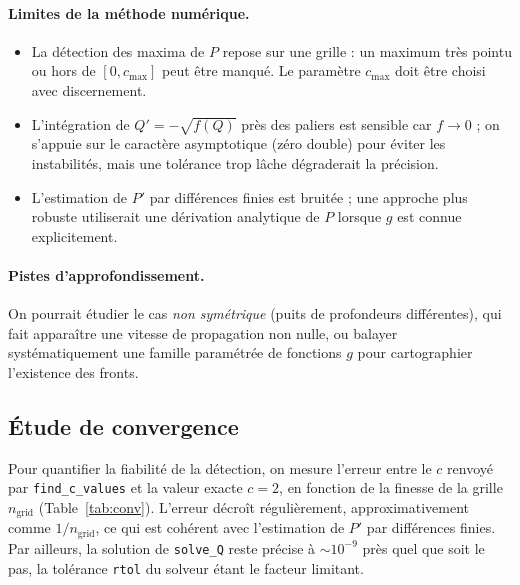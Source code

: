 \documentclass[11pt,a4paper]{article}
\theoremstyle{plain}
\theoremstyle{remark}
\begin{document}
\paragraph{Limites de la méthode numérique.}
\begin{itemize}[leftmargin=1.6em]
  \item La détection des maxima de $P$ repose sur une grille : un maximum très
  pointu ou hors de $[0,c_{\max}]$ peut être manqué. Le paramètre $c_{\max}$ doit
  être choisi avec discernement.
  \item L'intégration de $Q'=-\sqrt{f(Q)}$ près des paliers est sensible car
  $f\to0$ ; on s'appuie sur le caractère asymptotique (zéro double) pour éviter
  les instabilités, mais une tolérance trop lâche dégraderait la précision.
  \item L'estimation de $P'$ par différences finies est bruitée ; une approche
  plus robuste utiliserait une dérivation analytique de $P$ lorsque $g$ est connue
  explicitement.
\end{itemize}

\paragraph{Pistes d'approfondissement.} On pourrait étudier le cas
\emph{non symétrique} (puits de profondeurs différentes), qui fait apparaître une
vitesse de propagation non nulle, ou balayer systématiquement une famille
paramétrée de fonctions $g$ pour cartographier l'existence des fronts.

\subsection{Étude de convergence}
Pour quantifier la fiabilité de la détection, on mesure l'erreur entre le
$c$ renvoyé par \texttt{find\_c\_values} et la valeur exacte $c=2$, en fonction
de la finesse de la grille $n_{\text{grid}}$ (Table~\ref{tab:conv}). L'erreur
décroît régulièrement, approximativement comme $1/n_{\text{grid}}$, ce qui est
cohérent avec l'estimation de $P'$ par différences finies. Par ailleurs, la
solution de \texttt{solve\_Q} reste précise à $\sim10^{-9}$ près quel que soit le
pas, la tolérance \texttt{rtol} du solveur étant le facteur limitant.
\end{document}
